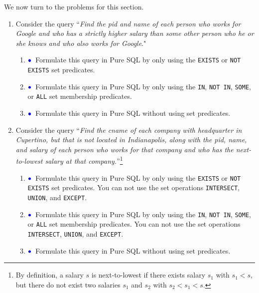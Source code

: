 \documentclass[11pt]{article}
\newcommand{\blue}[1]{{\color{blue}#1}}
\newcommand{\bluebullet}{$\blue{\bullet}$}
\begin{document}
\newpage
We now turn to the problems for this section.
\begin{enumerate}[resume]
\item\label{queryTwo}   
Consider the query ``\emph{Find the pid and name of each person who works for Google and who has a strictly higher salary
than some other person who he or she knows and who also works for Google}."

\begin{enumerate}
\item  \bluebullet\ Formulate this query in Pure SQL by only using the {\tt EXISTS} or {\tt NOT EXISTS} set predicates.

\item \bluebullet\ Formulate this query in Pure SQL by only using the {\tt  IN}, {\tt NOT IN}, {\tt SOME}, or {\tt ALL} set membership predicates.

\item  \bluebullet\  Formulate this query in Pure SQL without using set predicates.

\end{enumerate}

\item\label{queryThree}  Consider the query ``\emph{Find the cname of each company with headquarter in Cupertino, but that is not located in Indianapolis, along with the pid, name, and salary
of each person who works for that company and who has the next-to-lowest salary 
at that company.}''\footnote{By definition, a salary $s$ is next-to-lowest if there exists salary $s_1$ with $s_1<s$, but there do not exist
two salaries $s_1$ and $s_2$ with $s_2<s_1<s$.}


\begin{enumerate}
\item  \bluebullet\  Formulate this query in Pure SQL by only using the {\tt EXISTS} or {\tt NOT EXISTS} set predicates.
You can not use the set operations {\tt INTERSECT}, {\tt UNION}, and {\tt EXCEPT}.

\item  \bluebullet\  Formulate this query in Pure SQL by only using the {\tt  IN}, {\tt NOT IN}, {\tt SOME}, or {\tt ALL} set membership predicates.
You can not use the set operations {\tt INTERSECT}, {\tt UNION}, and {\tt EXCEPT}.

\item    \bluebullet\  Formulate this query in Pure SQL without using set predicates.

\end{enumerate}



\end{enumerate}
\end{document}
